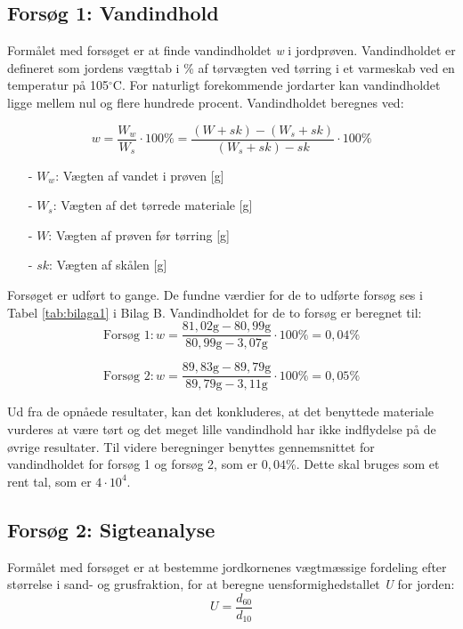 \subsection{Forsøg 1: Vandindhold}
Formålet med forsøget er at finde vandindholdet \textit{w} i jordprøven. Vandindholdet er defineret som jordens vægttab i \% af tørvægten ved tørring i et varmeskab ved en temperatur på 105$^{\circ}$C. For naturligt forekommende jordarter kan vandindholdet ligge mellem nul og flere hundrede procent.
\newline
\newline
Vandindholdet beregnes ved:

\begin{equation}
	w = \frac{W_w}{W_s}\cdot 100\% = \frac{(W+sk)-(W_s+sk)}{(W_s+sk)-sk}\cdot 100\%
\end{equation}

\begin{itemize}
	\item[-] $W_w$: Vægten af vandet i prøven [g]
	\item[-] $W_s$: Vægten af det tørrede materiale [g]
	\item[-] $W$: Vægten af prøven før tørring [g]
	\item[-] $sk$: Vægten af skålen [g]
\end{itemize}

Forsøget er udført to gange. De fundne værdier for de to udførte forsøg ses i Tabel \ref{tab:bilaga1} i Bilag B. Vandindholdet for de to forsøg er beregnet til:
\begin{equation}
	\text{Forsøg 1}: w = \frac{81,\!02 \text{g} - 80,\!99 \text{g}}{80,\!99 \text{g} - 3,\!07 \text{g}}\cdot 100\% = 0,\!04\%
\end{equation}

\begin{equation}
	\text{Forsøg 2}: w = \frac{89,\!83 \text{g} - 89,\!79 \text{g}}{89,\!79 \text{g} - 3,\!11 \text{g}}\cdot 100\% = 0,\!05\%
\end{equation}

Ud fra de opnåede resultater, kan det konkluderes, at det benyttede materiale vurderes at være tørt og det meget lille vandindhold har ikke indflydelse på de øvrige resultater.
\newline \indent{     }  Til videre beregninger benyttes gennemsnittet for vandindholdet for forsøg 1 og forsøg 2, som er $0,\!04$\%. Dette skal bruges som et rent tal, som er $4 \cdot 10^4$. 

\subsection{Forsøg 2: Sigteanalyse}
Formålet med forsøget er at bestemme jordkornenes vægtmæssige fordeling efter størrelse i sand- og grusfraktion, for at beregne uensformighedstallet \textit{U} for jorden:
\begin{equation}
	U = \frac{d_{60}}{d_{10}}
\end{equation}

